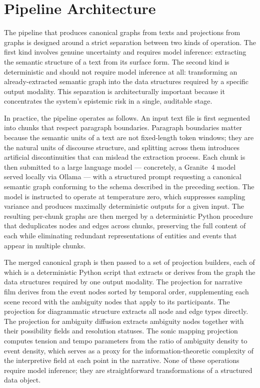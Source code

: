 \documentclass[12pt, a4paper]{article}
\begin{document}
\section{Pipeline Architecture}

The pipeline that produces canonical graphs from texts and projections from graphs is designed around a strict separation between two kinds of operation. The first kind involves genuine uncertainty and requires model inference: extracting the semantic structure of a text from its surface form. The second kind is deterministic and should not require model inference at all: transforming an already-extracted semantic graph into the data structures required by a specific output modality. This separation is architecturally important because it concentrates the system's epistemic risk in a single, auditable stage.

In practice, the pipeline operates as follows. An input text file is first segmented into chunks that respect paragraph boundaries. Paragraph boundaries matter because the semantic units of a text are not fixed-length token windows; they are the natural units of discourse structure, and splitting across them introduces artificial discontinuities that can mislead the extraction process. Each chunk is then submitted to a large language model — concretely, a Granite~4 model served locally via Ollama — with a structured prompt requesting a canonical semantic graph conforming to the schema described in the preceding section. The model is instructed to operate at temperature zero, which suppresses sampling variance and produces maximally deterministic outputs for a given input. The resulting per-chunk graphs are then merged by a deterministic Python procedure that deduplicates nodes and edges across chunks, preserving the full content of each while eliminating redundant representations of entities and events that appear in multiple chunks.

The merged canonical graph is then passed to a set of projection builders, each of which is a deterministic Python script that extracts or derives from the graph the data structures required by one output modality. The projection for narrative film derives from the event nodes sorted by temporal order, supplementing each scene record with the ambiguity nodes that apply to its participants. The projection for diagrammatic structure extracts all node and edge types directly. The projection for ambiguity diffusion extracts ambiguity nodes together with their possibility fields and resolution statuses. The sonic mapping projection computes tension and tempo parameters from the ratio of ambiguity density to event density, which serves as a proxy for the information-theoretic complexity of the interpretive field at each point in the narrative. None of these operations require model inference; they are straightforward transformations of a structured data object.
\end{document}
